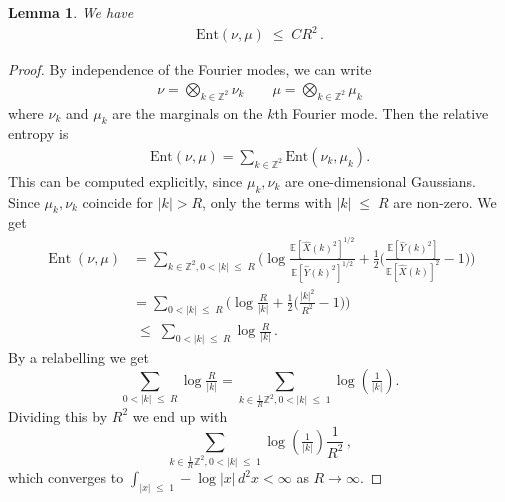 \documentclass[11pt]{article}
\numberwithin{equation}{section}
\newtheorem{lemma}[theorem]{Lemma}
\theoremstyle{definition}
\renewcommand{\leq}{\;\leqslant\;}                   %
\newcommand{\Z}{\mathbb{Z}}
\newcommand{\E}{\mathbb{E}}
\newcommand{\ab}{|}
\newcommand{\grea}{>}
\newcommand{\opn}{\operatorname}
\begin{document}
	
     \begin{lemma}\label{lem:entropy}
     We have
	\begin{align*}
  \mathrm{Ent}(\nu,\mu)\leq C R^{2}\,.
	\end{align*}
  \end{lemma}
  \begin{proof}
By independence of the Fourier modes, we can write 
\begin{align*}
\nu = \bigotimes_{k\in \mathbb{Z}^2 } \nu_{k} \qquad \mu= \bigotimes_{k \in \mathbb{Z}^2 } \mu_k
\end{align*}
where $\nu_k$ and $\mu_{k}$ are the marginals on the $k$th Fourier mode. Then the relative entropy is 
\begin{align*}
\mathrm{Ent}(\nu,\mu)=\sum_{k\in\mathbb{Z}^2 } \mathrm{Ent}(\nu_k,\mu_k).
\end{align*}
This can be computed explicitly, since $\mu_k, \nu_k$ are one-dimensional Gaussians. Since $\mu_k, \nu_k$ coincide for $|k|\grea R$, only the terms with $\ab k \ab \leq R$ are non-zero. We get
\begin{align*}
\opn{Ent}(\nu,\mu) &= \sum_{k \in \Z^2, 0 <  |k| \leq R} \Big( \log \frac{ \E [\hat X(k)^2]^{1/2}  }{\E[\hat Y(k)^2]^{1/2}} + \frac{1}{2} \big( \frac{\E[\hat Y(k)^2]}{\E[\hat X(k)]^2} -1  \big) \Big) \\
&= \sum_{0 <  |k| \leq R} \big( \log \tfrac{R}{|k|} + \tfrac{1}{2} \big( \tfrac{|k|^2}{R^2} -1 \big) \big) \\
& \leq \sum_{0 <  |k| \leq R} \log \tfrac{R}{|k|}\,.
\end{align*}
  By a relabelling we get 
  \[ \sum_{ 0 \less \ab k \ab \leq R} \log \tfrac{R}{\ab k \ab } = \sum_{k \in\frac {1}{R} \mathbb{Z}^{2}, 0 \less |k|\leq 1}  \log(\tfrac{1}{|k|}). \]
  Dividing this by $R^{2}$ we end up with 
  \[
   \sum_{k \in\frac {1}{R} \mathbb{Z}^{2}, 0 \less |k| \leq 1}   \log(\tfrac{1}{|k|}) \frac{1}{R^2}\,,
  \]
  which converges to 
  $\int_{|x|\leq 1} -\log |x| \, d^2x <\infty$  as $R\to \infty$.  
  \end{proof}
  
\end{document}
